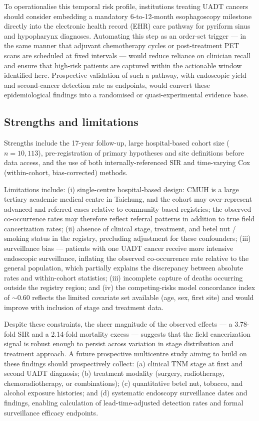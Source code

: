 \documentclass[12pt,a4paper]{article}
\begin{document}
To operationalise this temporal risk profile, institutions treating UADT
cancers should consider embedding a mandatory 6-to-12-month esophagoscopy
milestone directly into the electronic health record (EHR) care pathway for
pyriform sinus and hypopharynx diagnoses.
Automating this step as an order-set trigger — in the same manner that
adjuvant chemotherapy cycles or post-treatment PET scans are scheduled
at fixed intervals — would reduce reliance on clinician recall and ensure
that high-risk patients are captured within the actionable window identified
here.
Prospective validation of such a pathway, with endoscopic yield and
second-cancer detection rate as endpoints, would convert these
epidemiological findings into a randomised or quasi-experimental evidence base.

\subsection{Strengths and limitations}

Strengths include the 17-year follow-up, large hospital-based cohort size
($n = 10{,}113$), pre-registration of primary hypotheses and site definitions
before data access, and the use of both internally-referenced SIR and
time-varying Cox (within-cohort, bias-corrected) methods.

Limitations include: (i) single-centre hospital-based design: CMUH is a
large tertiary academic medical centre in Taichung, and the cohort may
over-represent advanced and referred cases relative to community-based
registries; the observed co-occurrence rates may therefore reflect referral
patterns in addition to true field cancerization rates;
(ii) absence of clinical stage, treatment, and
betel nut / smoking status in the registry, precluding adjustment for
these confounders; (iii) surveillance bias — patients with one UADT cancer
receive more intensive endoscopic surveillance, inflating the observed
co-occurrence rate relative to the general population, which partially explains
the discrepancy between absolute rates and within-cohort statistics;
(iii) incomplete capture of deaths occurring outside the registry region;
and (iv) the competing-risks model concordance index of $\sim$0.60
reflects the limited covariate set available (age, sex, first site) and would
improve with inclusion of stage and treatment data.

Despite these constraints, the sheer magnitude of the observed effects —
a 3.78-fold SIR and a 2.14-fold mortality excess — suggests that the
field cancerization signal is robust enough to persist across variation in
stage distribution and treatment approach.
A future prospective multicentre study aiming to build on these findings
should prospectively collect: (a) clinical TNM stage at first and second
UADT diagnosis; (b) treatment modality (surgery, radiotherapy,
chemoradiotherapy, or combinations); (c) quantitative betel nut,
tobacco, and alcohol exposure histories; and (d) systematic endoscopy
surveillance dates and findings, enabling calculation of lead-time-adjusted
detection rates and formal surveillance efficacy endpoints.
\end{document}
